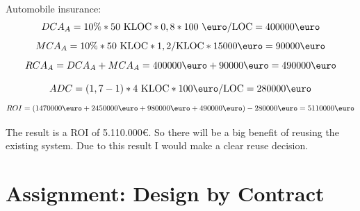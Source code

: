 \documentclass[a4paper,12pt,oneside]{scrreprt}
\begin{document}
Automobile insurance:
\begin{equation*}
	DCA_A = 10\% * 50 \text{ KLOC} * 0,8 * 100\text{ \euro/LOC} = 400000 \text{\euro}
\end{equation*}
\begin{equation*}
	MCA_A = 10\% * 50 \text{ KLOC} * 1,2/\text{KLOC} * 15000\text{\euro} = 90000\text{\euro}
\end{equation*}
\begin{equation*}
	RCA_A = DCA_A + MCA_A = 400000\text{\euro} + 90000\text{\euro} = 490000\text{\euro}
\end{equation*}

\begin{equation*}
	ADC =  (1,7 - 1) * 4\text{ KLOC} * 100 \text{\euro/LOC} = 280000\text{\euro}
\end{equation*}
\begin{equation*}
	ROI = (1470000\text{\euro} + 2450000\text{\euro} + 980000\text{\euro} + 490000\text{\euro}) - 280000\text{\euro} = 5110000\text{\euro}
\end{equation*}

The result is a ROI of 5.110.000\euro. So there will be a big benefit of reusing the existing system. Due to this result I would make a clear reuse decision.


\section{Assignment: Design by Contract}
\end{document}
